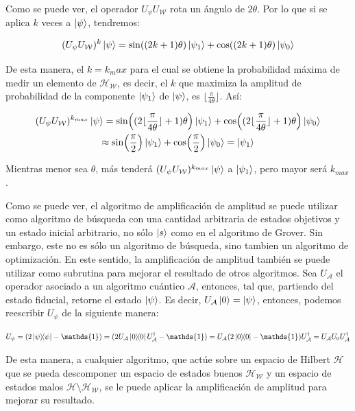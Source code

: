 Como se puede ver, el operador $U_\psi U_\mathcal{W}$ rota un ángulo de $2 \theta$. Por lo que si se aplica $k$ veces a $\ket{\psi}$, tendremos:

\begin{equation}
    (U_\psi U_\mathcal{W})^k \ket{\psi} = \sin( (2 k + 1) \theta) \ket{\psi_1} + \cos( (2 k + 1) \theta) \ket{\psi_0}
\end{equation}

De esta manera, el $k = k_max$ para el cual se obtiene la probabilidad máxima de medir un elemento de $\mathcal{H}_\mathcal{W}$, es decir, el $k$ que maximiza la amplitud de probabilidad de la componente $\ket{\psi_1}$ de $\ket{\psi}$, es $\lfloor \frac{\pi}{4 \theta} \rfloor$. Así:

\begin{multline}
    (U_\psi U_\mathcal{W})^{k_{max}} \ket{\psi} = \sin( (2 \lfloor \frac{\pi}{4 \theta} \rfloor + 1) \theta) \ket{\psi_1} + \cos( (2 \lfloor \frac{\pi}{4 \theta} \rfloor + 1) \theta) \ket{\psi_0} \\
    \approx \sin(\frac{\pi}{2}) \ket{\psi_1} + \cos(\frac{\pi}{2}) \ket{\psi_0} = \ket{\psi_1}
\end{multline}

Mientras menor sea $\theta$, más tenderá $(U_\psi U_\mathcal{W})^{k_{max}} \ket{\psi}$ a $\ket{\psi_1}$, pero mayor será $k_{max}$.

Como se puede ver, el algoritmo de amplificación de amplitud se puede utilizar como algoritmo de búsqueda con una cantidad arbitraria de estados objetivos y un estado inicial arbitrario, no sólo $\ket{s}$ como en el algoritmo de Grover. Sin embargo, este no es sólo un algoritmo de búsqueda, sino tambien un algoritmo de optimización. En este sentido, la amplificación de amplitud también se puede utilizar como subrutina para mejorar el resultado de otros algoritmos. Sea $U_\mathcal{A}$ el operador asociado a un algoritmo cuántico $\mathcal{A}$, entonces, tal que, partiendo del estado fiducial, retorne el estado $\ket{\psi}$. Es decir, $U_\mathcal{A} \ket{0} = \ket{\psi}$, entonces, podemos reescribir $U_\psi$ de la siguiente manera:

\begin{equation}
    U_\psi = (2 \ketbra{\psi} - \mathds{1}) = (2 U_\mathcal{A} \ketbra{0} U_\mathcal{A}^\dagger - \mathds{1}) = U_\mathcal{A} (2 \ketbra{0} - \mathds{1}) U_\mathcal{A}^\dagger = U_\mathcal{A} U_0 U_\mathcal{A}^\dagger
\end{equation}

De esta manera, a cualquier algoritmo, que actúe sobre un espacio de Hilbert $\mathcal{H}$ que se pueda descomponer un espacio de estados buenos $\mathcal{H}_\mathcal{W}$ y un espacio de estados malos $\mathcal{H} \setminus \mathcal{H}_\mathcal{W}$, se le puede aplicar la amplificación de amplitud para mejorar su resultado.

